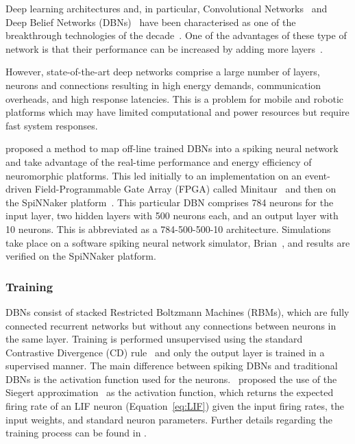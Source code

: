 Deep learning architectures and, in particular, Convolutional Networks~\cite{lecun1998gradient} and Deep Belief Networks (DBNs)~\cite{hinton2006fast} have been characterised as one of the breakthrough technologies of the decade~\cite{MIT_TechReview}. One of the advantages of these type of network is that their performance can be increased by adding more layers~\cite{hinton2006fast}.

However, state-of-the-art deep networks comprise a large number of layers, neurons and connections resulting in high energy demands, communication overheads, and high response latencies. This is a problem for mobile and robotic platforms which may have limited computational and power resources but require fast system responses. 


\cite{o2013real} proposed a method to map off-line trained DBNs into a spiking neural network and take advantage of the real-time performance and energy efficiency of neuromorphic platforms. This led initially to an implementation on an event-driven Field-Programmable Gate Array (FPGA) called Minitaur~\cite{neil2014minitaur} and then on the SpiNNaker platform~\cite{Stromatias2015scalable}.
This particular DBN comprises 784 neurons for the input layer, two hidden layers with 500 neurons each, and an output layer with 10 neurons. This is abbreviated as a 784-500-500-10 architecture.
Simulations take place on a software spiking neural network simulator, Brian~\cite{goodman2008brian}, and results are verified on the SpiNNaker platform.

\subsubsection{Training}

DBNs consist of stacked Restricted Boltzmann Machines (RBMs), which are fully connected recurrent networks but without any connections between neurons in the same layer. Training is performed unsupervised using the standard Contrastive Divergence (CD) rule~\cite{hinton2006fast} and only the output layer is trained in a supervised manner. The main difference between spiking DBNs and traditional DBNs is the activation function used for the neurons.~\cite{o2013real} proposed the use of the Siegert approximation~\cite{Jug_etal_2012} as the activation function, which returns the expected firing rate of an LIF neuron (Equation~\ref{eq:LIF}) given the input firing rates, the input weights, and standard neuron parameters. Further details regarding the training process can be found in \cite{o2013real}.

